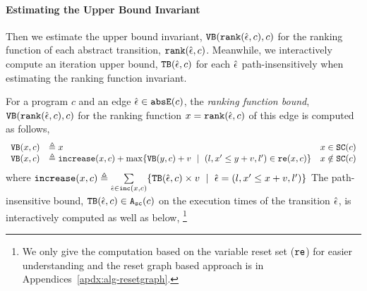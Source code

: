 \paragraph{Estimating the Upper Bound Invariant}
Then we estimate the upper bound invariant,  ${\mathtt{VB}}(\mathtt{rank}(\hat{\mathtt{\epsilon}{}}, c), c)$ for the ranking function of each abstract transition, $\mathtt{rank}(\hat{\mathtt{\epsilon}{}}, c)$. Meanwhile, we interactively compute an iteration upper bound,  ${\mathtt{TB}}(\hat{\mathtt{\epsilon}{}}, c)$  for each $\hat{\mathtt{\epsilon}{}}$ path-insensitively when estimating the ranking function invariant.
\begin{defn}
  \label{def:ranking_bound}
For a program $c$ and an edge $\hat{\mathtt{\epsilon}{}} \in \mathtt{abs}{\mathtt{E}}(c)$,
the \emph{ranking function bound}, 
${\mathtt{VB}}(\mathtt{rank}(\hat{\mathtt{\epsilon}{}}, c), c)$ for the ranking function $x = \mathtt{rank}(\hat{\mathtt{\epsilon}{}}, c)$
of this edge
is computed as follows,
{\small
  \[ 
\begin{array}{lll}
  \varinvar(x, c) & \triangleq x & x \in \scvar(c) \\
  \varinvar(x, c) & \triangleq \incrs(x, c) + \max\left\{\varinvar(y, c) + v ~\mid~ (l, x' \leq y + v, l') \in \reset(x, c) \right\} & x \notin \scvar(c)
\end{array}
\]
}
%
where $\mathtt{increase}(x, c) \triangleq \sum\limits_{\hat{\mathtt{\epsilon}{}} \in \mathtt{inc}(x, c)}\{{\mathtt{TB}}(\hat{\mathtt{\epsilon}{}}, c) \times v ~\mid~ \hat{\mathtt{\epsilon}{}} = (l, x' \leq x + v, l')\}$
The path-insensitive bound, ${\mathtt{TB}}(\hat{\mathtt{\epsilon}{}}, c) \in {\ensuremath{\mathtt{A_{sc}}}}(c)$  on the execution times of the transition $\hat{\mathtt{\epsilon}{}}$, is interactively computed as well as below,
\footnote{We only give the computation based on the variable reset set ($\mathtt{re}$) for  easier understanding
and the reset graph based approach is in Appendices~\ref{apdx:alg-resetgraph}.
}
{\small
}
\end{defn}
